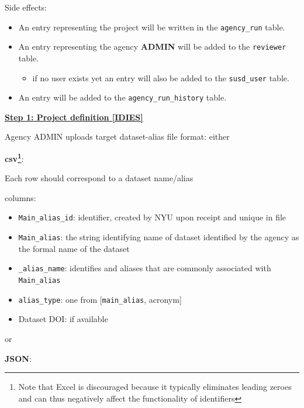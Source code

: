 \documentclass[titlepage, 11pt]{article}
\begin{document}
{Side effects:
\begin{itemize}
    \item An entry representing the project will be written in the \texttt{agency\_run} table.
    \item An entry representing the agency \textbf{ADMIN} will be added to the \texttt{reviewer} table.\begin{itemize}
        \item if no user exists yet an entry will also be added to the \texttt{susd\_user} table.
    \end{itemize}
    \item An entry will be added to the \texttt{agency\_run\_history} table.
\end{itemize}

\bigskip

\underline{\textbf{Step 1: Project definition [IDIES]}}

Agency ADMIN uploads target dataset-alias file format: either

\textbf{csv\footnote{Note that Excel is discouraged because it typically eliminates leading zeroes and can thus negatively affect the functionality of identifiers
}}: %

\hspace{1cm}
\begin{minipage}{\textwidth}

Each row should correspond to a dataset name/alias

columns:
\begin{itemize}
    \item \texttt{Main\_alias\_id}: identifier, created by NYU upon receipt and unique in file
    \item \texttt{Main\_alias}: the string identifying name of dataset identified by the agency as the formal name of the dataset
    \item \texttt{\_alias\_name}: identifies and aliases that are commonly associated with \texttt{Main\_alias}
    \item \texttt{alias\_type}: one from [\texttt{main\_alias}, acronym]
    \item Dataset DOI: if available
    
\end{itemize}

\end{minipage}


or

\textbf{JSON}:

}
\end{document}
